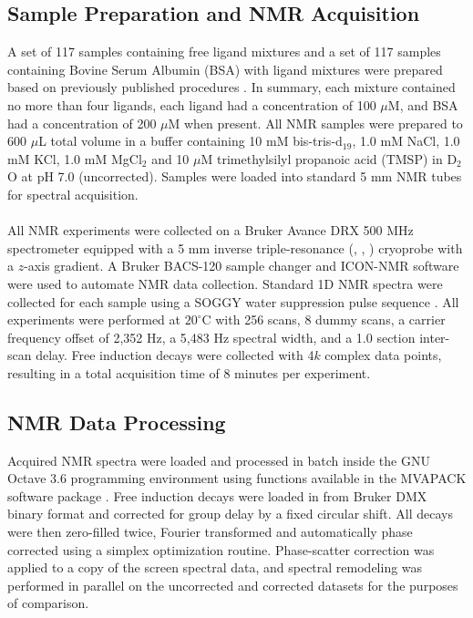 \subsection{Sample Preparation and NMR Acquisition}

\begin{doublespace}
A set of 117 samples containing free ligand mixtures and a set of 117 samples
containing Bovine Serum Albumin (BSA) with ligand mixtures were prepared based
on previously published procedures \cite{powers:ddt2008,mercier:cchts2009}.
In summary, each mixture contained no more than four ligands, each ligand had
a concentration of 100 $\mu$M, and BSA had a concentration of 200 $\mu$M when
present. All NMR samples were prepared to 600 $\mu$L total volume in a buffer
containing 10 mM bis-tris-d$_{19}$, 1.0 mM NaCl, 1.0 mM KCl, 1.0 mM MgCl$_2$
and 10 $\mu$M trimethylsilyl propanoic acid (TMSP) in D$_2$O at pH 7.0
(uncorrected). Samples were loaded into standard 5 mm NMR tubes for spectral
acquisition.
\\\\
All NMR experiments were collected on a Bruker Avance DRX 500 MHz spectrometer
equipped with a 5 mm inverse triple-resonance (\hnmr{}, \cnmr{}, \nnmr{})
cryoprobe with a $z$-axis gradient. A Bruker BACS-120 sample changer and
ICON-NMR software were used to automate NMR data collection. Standard 1D
\hnmr{} NMR spectra were collected for each sample using a SOGGY water
suppression pulse sequence \cite{hwang:jmr1995,nguyen:jmr2007}. All
experiments were performed at $20^\circ$C with 256 scans, 8 dummy scans,
a carrier frequency offset of 2,352 Hz, a 5,483 Hz spectral width, and a 1.0
section inter-scan delay. Free induction decays were collected with 4$k$
complex data points, resulting in a total acquisition time of 8 minutes per
experiment.
\end{doublespace}

\subsection{NMR Data Processing}

\begin{doublespace}
Acquired NMR spectra were loaded and processed in batch inside the GNU Octave
3.6 programming environment \cite{eaton2008} using functions available in the
MVAPACK software package \cite{worley:acscb2014}. Free induction decays were
loaded in from Bruker DMX binary format and corrected for group delay by a
fixed circular shift. All decays were then zero-filled twice, Fourier
transformed and automatically phase corrected using a simplex optimization
routine. Phase-scatter correction was applied to a copy of the screen spectral
data, and spectral remodeling was performed in parallel on the uncorrected and
corrected datasets for the purposes of comparison.
\end{doublespace}

